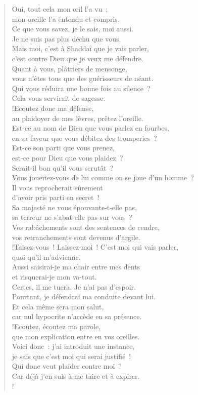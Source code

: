 \documentclass[french,twoside]{book} %
\begin{document}
\begin{verse}
Oui, tout cela mon œil l’a vu ; \\
mon oreille l’a entendu et compris.\\
Ce que vous savez, je le sais, moi aussi. \\
Je ne suis pas plus déchu que vous.\\
Mais moi, c’est à Shaddaï que je vais parler, \\
c’est contre Dieu que je veux me défendre.\\
Quant à vous, plâtriers de mensonge, \\
vous n’êtes tous que des guérisseurs de néant.\\
Qui vous réduira une bonne fois au silence ? \\
Cela vous servirait de sagesse.\\!Ecoutez donc ma défense, \\
au plaidoyer de mes lèvres, prêtez l’oreille.\\
Est-ce au nom de Dieu que vous parlez en fourbes, \\
en sa faveur que vous débitez des tromperies ?\\
Est-ce son parti que vous prenez, \\
est-ce pour Dieu que vous plaidez ?\\
Serait-il bon qu’il vous scrutât ? \\
Vous joueriez-vous de lui comme on se joue d’un homme ?\\
Il vous reprocherait sûrement \\
d’avoir pris parti en secret !\\
Sa majesté ne vous épouvante-t-elle pas, \\
sa terreur ne s’abat-elle pas sur vous ?\\
Vos rabâchements sont des sentences de cendre, \\
vos retranchements sont devenus d’argile.\\!Taisez-vous ! Laissez-moi ! C’est moi qui vais parler, \\
quoi qu’il m’advienne.\\
Aussi saisirai-je ma chair entre mes dents \\
et risquerai-je mon va-tout.\\
Certes, il me tuera. Je n’ai pas d’espoir. \\
Pourtant, je défendrai ma conduite devant lui.\\
Et cela même sera mon salut, \\
car nul hypocrite n’accède en sa présence.\\!Ecoutez, écoutez ma parole, \\
que mon explication entre en vos oreilles.\\
Voici donc : j’ai introduit une instance, \\
je sais que c’est moi qui serai justifié !\\
Qui donc veut plaider contre moi ? \\
Car déjà j’en suis à me taire et à expirer.\\!
\end{verse}
\end{document}
